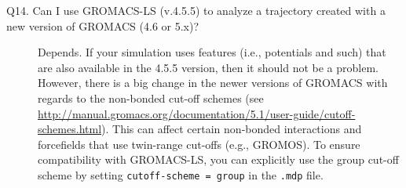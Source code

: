 \documentclass[10pt,letterpaper,notitlepage]{article}
\begin{document}
\begin{description}
\item[Q14. Can I use GROMACS-LS (v.4.5.5) to analyze a trajectory created with a new version of GROMACS (4.6 or 5.x)?] Depends. If your simulation uses features (i.e., potentials and such) that are also available in the 4.5.5 version, then it should not be a problem. However, there is a big change in the newer versions of GROMACS with regards to the non-bonded cut-off schemes (see \url{http://manual.gromacs.org/documentation/5.1/user-guide/cutoff-schemes.html}). This can affect certain non-bonded interactions and forcefields that use twin-range cut-offs (e.g., GROMOS). To ensure compatibility with GROMACS-LS, you can explicitly use the group cut-off scheme by setting \texttt{cutoff-scheme = group} in the \texttt{.mdp} file.

\end{description}
\end{document}
